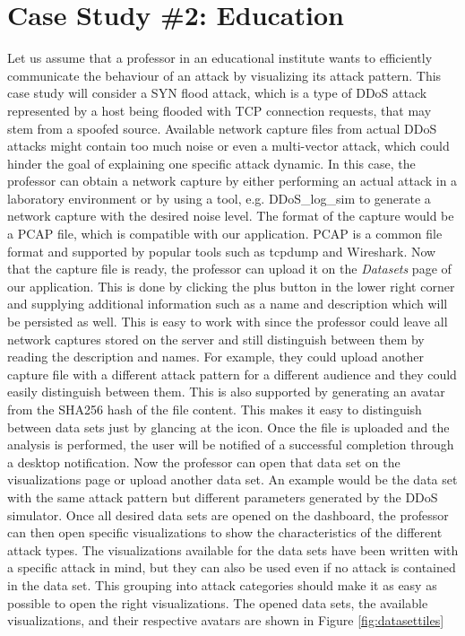 \section{Case Study \#2: Education} \label{casestudyeducation}
Let us assume that a professor in an educational institute wants to efficiently communicate the behaviour of an attack by visualizing its attack pattern. This case study will consider a SYN flood attack, which is a type of DDoS attack represented by a host being flooded with TCP connection requests, that may stem from a spoofed source.
Available network capture files from actual DDoS attacks might contain too much noise or even a multi-vector attack, which could hinder the goal of explaining one specific attack dynamic. In this case, the professor can obtain a network capture by either performing an actual attack in a laboratory environment or by using a tool, e.g. DDoS\_log\_sim \cite{ddoslogsim} to generate a network capture with the desired noise level. The format of the capture would be a PCAP file, which is compatible with our application. PCAP is a common file format and supported by popular tools such as tcpdump and Wireshark.
Now that the capture file is ready, the professor can upload it on the \textit{Datasets} page of our application. This is done by clicking the plus button in the lower right corner and supplying additional information such as a name and description which will be persisted as well. This is easy to work with since the professor could leave all network captures stored on the server and still distinguish between them by reading the description and names. For example, they could upload another capture file with a different attack pattern for a different audience and they could easily distinguish between them. This is also supported by generating an avatar from the SHA256 hash of the file content. This makes it easy to distinguish between data sets just by glancing at the icon. Once the file is uploaded and the analysis is performed, the user will be notified of a successful completion through a desktop notification. Now the professor can open that data set on the visualizations page or upload another data set. An example would be the data set with the same attack pattern but different parameters generated by the DDoS simulator.
Once all desired data sets are opened on the dashboard, the professor can then open specific visualizations to show the characteristics of the different attack types. The visualizations available for the data sets have been written with a specific attack in mind, but they can also be used even if no attack is contained in the data set. This grouping into attack categories should make it as easy as possible to open the right visualizations. The opened data sets, the available visualizations, and their respective avatars are shown in Figure \ref{fig:datasettiles}

